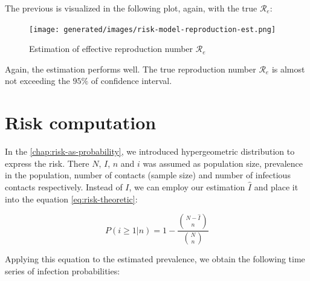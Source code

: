 \documentclass[
  digital, %
  oneside, %
  lof,     %
  lot,     %
]{fithesis4}
\begin{document}
The previous is visualized in the following plot, again,
with the true $\mathcal{R}_e$:

\begin{figure}[H]
  \begin{center}
    \texttt{[image: generated/images/risk-model-reproduction-est.png]}
  \end{center}
  \caption{Estimation of effective reproduction number $\mathcal{R}_e$}
  \label{fig:risk-model-reproduction-est}
\end{figure}

Again, the estimation performs well.
The true reproduction number $\mathcal{R}_e$
is almost not exceeding the $95 \%$ of 
confidence interval.


\section{Risk computation}

In the \autoref{chap:risk-as-probability}, we introduced
hypergeometric distribution to express the risk.
There $N$, $I$, $n$ and $i$ was assumed as 
population size, prevalence in the population,
number of contacts (sample size) and number of 
infectious contacts respectively.
Instead of $I$, we can employ our estimation $\hat{I}$
and place it into the equation \ref{eq:risk-theoretic}:


\begin{equation}
  P(i \geq 1|n) = 1 - \frac{
    \binom{N - \hat{I}}{n}
  }{
    \binom{N}{n}
  }
\end{equation}

Applying this equation to the estimated prevalence,
we obtain the following time series of infection probabilities:

  

\end{document}
